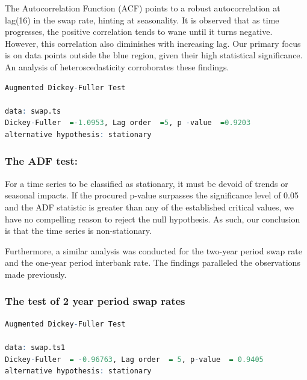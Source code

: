 \documentclass[10pt]{article}
\begin{document}
The Autocorrelation Function (ACF) points to a robust autocorrelation at lag(16) in the swap rate, hinting at seasonality. It is observed that as time progresses, the positive correlation tends to wane until it turns negative. However, this correlation also diminishes with increasing lag. Our primary focus is on data points outside the blue region, given their high statistical significance. An analysis of heteroscedasticity corroborates these findings.

\begin{lstlisting}[language = R]
        Augmented Dickey-Fuller Test
    
data: swap.ts
Dickey-Fuller  =-1.0953, Lag order  =5, p -value  =0.9203  
alternative hypothesis: stationary    

\end{lstlisting}

\subsubsection{The ADF test:}

For a time series to be classified as stationary, it must be devoid of trends or seasonal impacts. If the procured p-value surpasses the significance level of 0.05 and the ADF statistic is greater than any of the established critical values, we have no compelling reason to reject the null hypothesis. As such, our conclusion is that the time series is non-stationary.

Furthermore, a similar analysis was conducted for the two-year period swap rate and the one-year period interbank rate. The findings paralleled the observations made previously.

\subsubsection{The test of 2 year period swap rates}

\begin{lstlisting}[language = R]
        Augmented Dickey-Fuller Test
        
data: swap.ts1
Dickey-Fuller  = -0.96763, Lag order  = 5, p-value  = 0.9405 
alternative hypothesis: stationary  

\end{lstlisting}
\end{document}
